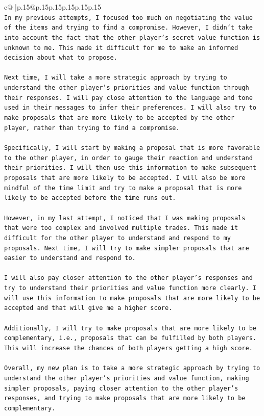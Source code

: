 \documentclass{article}
\begin{document}
{\begin{supertabular}{c@{$\;$}|p{.15\linewidth}@{}p{.15\linewidth}p{.15\linewidth}p{.15\linewidth}p{.15\linewidth}p{.15\linewidth}}
{{{\\ 
\texttt{In my previous attempts, I focused too much on negotiating the value of the items and trying to find a compromise. However, I didn't take into account the fact that the other player's secret value function is unknown to me. This made it difficult for me to make an informed decision about what to propose.} \\
\\ 
\texttt{Next time, I will take a more strategic approach by trying to understand the other player's priorities and value function through their responses. I will pay close attention to the language and tone used in their messages to infer their preferences. I will also try to make proposals that are more likely to be accepted by the other player, rather than trying to find a compromise.} \\
\\ 
\texttt{Specifically, I will start by making a proposal that is more favorable to the other player, in order to gauge their reaction and understand their priorities. I will then use this information to make subsequent proposals that are more likely to be accepted. I will also be more mindful of the time limit and try to make a proposal that is more likely to be accepted before the time runs out.} \\
\\ 
\texttt{However, in my last attempt, I noticed that I was making proposals that were too complex and involved multiple trades. This made it difficult for the other player to understand and respond to my proposals. Next time, I will try to make simpler proposals that are easier to understand and respond to.} \\
\\ 
\texttt{I will also pay closer attention to the other player's responses and try to understand their priorities and value function more clearly. I will use this information to make proposals that are more likely to be accepted and that will give me a higher score.} \\
\\ 
\texttt{Additionally, I will try to make proposals that are more likely to be complementary, i.e., proposals that can be fulfilled by both players. This will increase the chances of both players getting a high score.} \\
\\ 
\texttt{Overall, my new plan is to take a more strategic approach by trying to understand the other player's priorities and value function, making simpler proposals, paying closer attention to the other player's responses, and trying to make proposals that are more likely to be complementary.} \\
}}}
\end{supertabular}}
\end{document}
